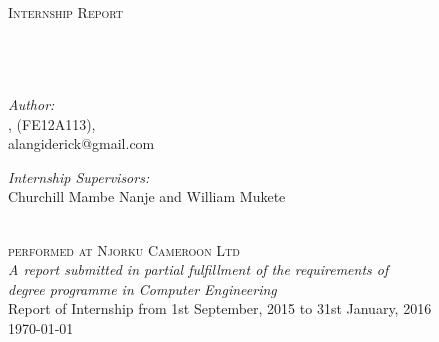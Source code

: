 \documentclass[
11pt, %
english, %
singlespacing, %
headsepline, %
]{InternshipReport} %
\author{Alangi \textsc{Derick}} %
\begin{document}
\frontmatter %

\pagestyle{plain} %


\begin{titlepage}
\begin{center}

\textsc{\LARGE \univname}\\[1.5cm] %
\textsc{\Large Internship Report}\\[0.5cm] %

\HRule \\[0.4cm] %
{\huge \bfseries \ttitle}\\[0.4cm] %
\HRule \\[1cm] %

\begin{minipage}{0.4\textwidth}
\begin{flushleft} \large
\emph{Author:}\\
{\authorname, (FE12A113), \\ alangiderick@gmail.com} %
\end{flushleft}
\end{minipage}
\begin{minipage}{0.4\textwidth}
\begin{flushright} \large
\emph{Internship Supervisors:} \\
{Churchill Mambe Nanje and William Mukete} %
\end{flushright}
\end{minipage}\\[1.8cm]

\textsc{\Large performed at \LARGE Njorku Cameroon Ltd}\\[2.0cm] %
 
\large \textit{A report submitted in partial fulfillment of the requirements of \\ \degreename degree programme in Computer Engineering} \\[1.2cm] %

\large{Report of Internship from 1st September, 2015 to 31st January, 2016}\\[2cm]
 
{\large \today}\\[4cm] %
 
\vfill
\end{center}
\end{titlepage}
\end{document}

